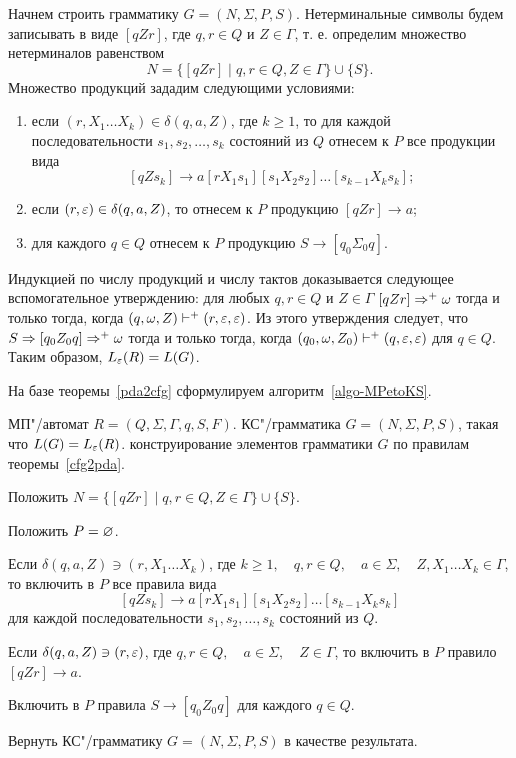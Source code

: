 \begin{myproof}
Начнем строить грамматику $G=(N,\Sigma,P,S)$. Нетерминальные символы будем записывать в виде $[qZr]$, где $q,r\in Q$ и $Z\in\Gamma$, т. е. определим множество нетерминалов равенством
\[
N =\{[qZr]\mid q,r\in Q, Z\in\Gamma\} \cup \{S\}.
\]
Множество продукций зададим следующими условиями:
\begin{enumerate}
\item если $(r,X_1\ldots X_k)\in\delta(q,a,Z)$, где $k\ge 1$, то для каждой последовательности $s_1, s_2, \ldots , s_k$ состояний из $Q$ отнесем к $P$ все продукции вида
\[
[qZs_k] \to a[rX_1s_1][s_1X_2s_2]\ldots [s_{k-1}X_ks_k];
\]
\item если $(r,\varepsilon)\in\delta(q,a,Z)$, то отнесем к $P$ продукцию $[qZr]\to a$; \\
\item для каждого $q\in Q$ отнесем к $P$ продукцию $S\to[q_0\Sigma_0q]$.
\end{enumerate}

Индукцией по числу продукций и числу тактов доказывается следующее вспомогательное утверждению: для любых $q,r\in Q$ и $Z\in\Gamma$ $[qZr]\Rightarrow^+\omega$ тогда и только тогда, когда $(q,\omega,Z)\vdash^+(r,\varepsilon,\varepsilon)$. Из этого утверждения следует, что $S\Rightarrow[q_0Z_0q]\Rightarrow^+\omega$ тогда и только тогда, когда $(q_0,\omega,Z_0)\vdash^+(q,\varepsilon,\varepsilon)$ для $q\in Q$. Таким образом, $L_\varepsilon(R)=L(G)$.
\end{myproof}

На базе теоремы~\ref{pda2cfg} сформулируем алгоритм~\ref{algo-MPetoKS}.

{\label{algo-MPetoKS} МП"/автомат $R = (Q, \Sigma, \Gamma, q, S, F)$. }
{КС"/грамматика $G = (N, \Sigma, P, S)$, такая что $L(G) = L_\varepsilon(R)$.}
{ конструирование элементов грамматики $G$ по правилам теоремы~\ref{cfg2pda}. }
{
\item Положить $N = \{ [qZr] \mid q, r \in Q, Z \in \Gamma \} \cup \{ S \}$.

\item Положить $P = \varnothing$.

\item Если $\delta(q, a, Z) \ni (r, X_1 \ldots X_k)$, где $k \geq 1, \quad q, r \in Q, \quad a \in \Sigma, \quad Z, X_1 \ldots X_k \in \Gamma$, то включить в $P$ все правила вида 
\[
	[qZs_k] \to a[rX_1s_1][s_1X_2s_2] \ldots [s_{k-1}X_ks_k]
\]  
для каждой последовательности $s_1, s_2, \ldots , s_k$ состояний из $Q$.

\item Если $\delta(q, a, Z) \ni (r, \varepsilon)$, где $q, r \in Q, \quad a \in \Sigma, \quad Z \in \Gamma$, то включить в $P$ правило $[qZr] \to a$.

\item Включить в $P$ правила $S \to [q_0Z_0q]$ для каждого $q \in Q$.

\item Вернуть КС"/грамматику $G = (N, \Sigma, P, S)$ в качестве результата.
}

